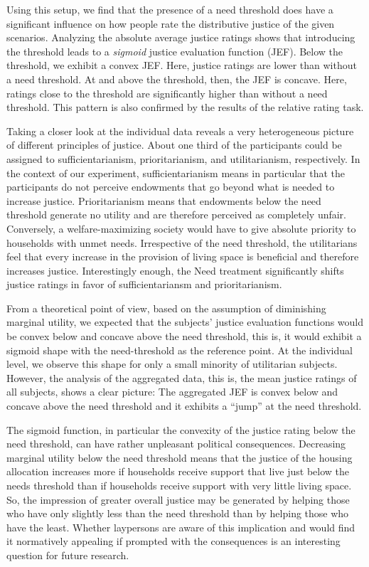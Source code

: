 \documentclass[12pt]{scrartcl}
\begin{document}
Using this setup, we find that the presence of a need threshold does have a significant influence on how people rate the distributive justice of the given scenarios.
Analyzing the absolute average justice ratings shows that introducing the threshold leads to a \textit{sigmoid} justice evaluation function (JEF).
Below the threshold, we exhibit a convex JEF.
Here, justice ratings are lower than without a need threshold.
At and above the threshold, then, the JEF is concave.
Here, ratings close to the threshold are significantly higher than without a need threshold.
This pattern is also confirmed by the results of the relative rating task.

Taking a closer look at the individual data reveals a very heterogeneous picture of different principles of justice.
About one third of the participants could be assigned to sufficientarianism, prioritarianism, and utilitarianism, respectively.
In the context of our experiment, sufficientarianism means in particular that the participants do not perceive endowments that go beyond what is needed to increase justice.
Prioritarianism means that endowments below the need threshold generate no utility and are therefore perceived as completely unfair.
Conversely, a welfare-maximizing society would have to give absolute priority to households with unmet needs.
Irrespective of the need threshold, the utilitarians feel that every increase in the provision of living space is beneficial and therefore increases justice.
Interestingly enough, the Need treatment significantly shifts justice ratings in favor of sufficientariansm and prioritarianism.

From a theoretical point of view, based on the assumption of diminishing marginal utility, we expected that the subjects' justice evaluation functions would be convex below and concave above the need threshold, this is, it would exhibit a sigmoid shape with the need-threshold as the reference point.
At the individual level, we observe this shape for only a small minority of utilitarian subjects.
However, the analysis of the aggregated data, this is, the mean justice ratings of all subjects, shows a clear picture: The aggregated JEF is convex below and concave above the need threshold and it exhibits a ``jump'' at the need threshold.

The sigmoid function, in particular the convexity of the justice rating below the need threshold, can have rather unpleasant political consequences.
Decreasing marginal utility below the need threshold means that the justice of the housing allocation increases more if households receive support that live just below the needs threshold than if households receive support with very little living space.
So, the impression of greater overall justice may be generated by helping those who have only slightly less than the need threshold than by helping those who have the least.
Whether laypersons are aware of this implication and would find it normatively appealing if prompted with the consequences is an interesting question for future research.
\end{document}

